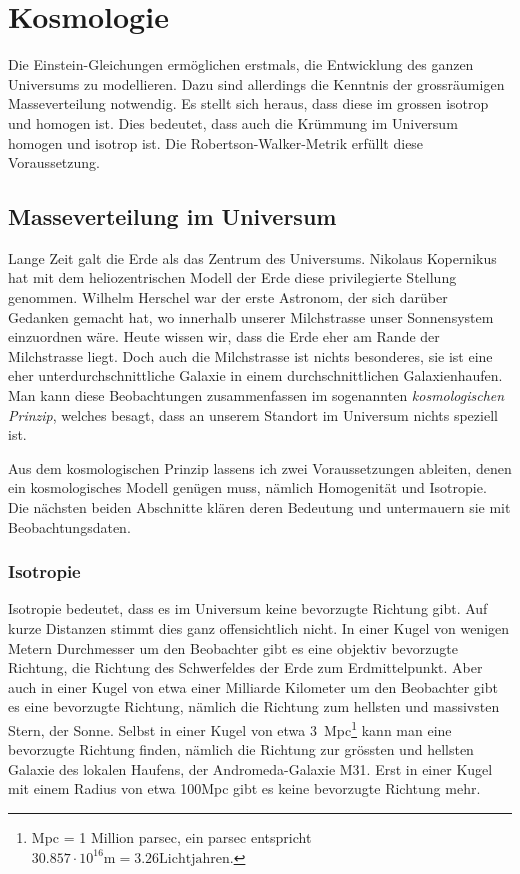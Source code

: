 %
%
%
\chapter{Kosmologie%
\label{skript:chapter:kosmologie}}
\rhead{}
Die Einstein-Gleichungen ermöglichen erstmals, die Entwicklung
des ganzen Universums zu modellieren.
Dazu sind allerdings die Kenntnis der grossräumigen
Masseverteilung notwendig.
Es stellt sich heraus, dass diese im grossen isotrop und homogen ist.
Dies bedeutet, dass auch die Krümmung im Universum homogen und isotrop
ist.
Die Robertson-Walker-Metrik erfüllt diese Voraussetzung.

\section{Masseverteilung im Universum}
Lange Zeit galt die Erde als das Zentrum des Universums.
Nikolaus Kopernikus hat mit dem heliozentrischen Modell der Erde
diese privilegierte Stellung genommen.
Wilhelm Herschel war der erste Astronom, der sich darüber Gedanken
gemacht hat, wo innerhalb unserer Milchstrasse unser Sonnensystem
einzuordnen wäre.
Heute wissen wir, dass die Erde eher am Rande der Milchstrasse liegt.
Doch auch die Milchstrasse ist nichts besonderes, sie ist eine eher
unterdurchschnittliche Galaxie in einem durchschnittlichen
Galaxienhaufen.
Man kann diese Beobachtungen zusammenfassen im sogenannten
{\em kosmologischen Prinzip}, welches besagt, dass an unserem
Standort im Universum nichts speziell ist.

Aus dem kosmologischen Prinzip lassens ich zwei Voraussetzungen
ableiten, denen ein kosmologisches Modell genügen muss, nämlich
Homogenität und Isotropie.
Die nächsten beiden Abschnitte klären deren Bedeutung und untermauern
sie mit Beobachtungsdaten.

\subsection{Isotropie}
Isotropie bedeutet, dass es im Universum keine bevorzugte Richtung
gibt.
Auf kurze Distanzen stimmt dies ganz offensichtlich nicht.
In einer Kugel von wenigen Metern Durchmesser um den Beobachter
gibt es eine objektiv bevorzugte Richtung, die Richtung des Schwerfeldes
der Erde zum Erdmittelpunkt.
Aber auch in einer Kugel von etwa einer Milliarde Kilometer um
den Beobachter gibt es eine bevorzugte Richtung, nämlich die
Richtung zum hellsten und massivsten Stern, der Sonne.
Selbst in einer Kugel von etwa 3~Mpc\footnote{Mpc = 1 Million parsec,
ein parsec entspricht $30.857\cdot 10^{16}\text{m} = 3.26\text{Lichtjahren}$.}
kann man eine bevorzugte Richtung finden, nämlich die Richtung zur grössten
und hellsten Galaxie des lokalen Haufens, der Andromeda-Galaxie M31.
Erst in einer Kugel mit einem Radius von etwa 100Mpc gibt es keine
bevorzugte Richtung mehr. 

